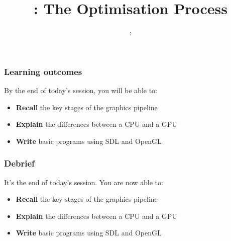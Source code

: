 \usepackage{../../beamerthemeFalmouthGamesAcademy}
\usepackage{multimedia}
\graphicspath{ {../../} }


\usepackage[normalem]{ulem}
\usepackage{wasysym}

\usepackage{pdfpages}

\usetikzlibrary{arrows,automata}




\title{\sessionnumber: The Optimisation Process}
\subtitle{\modulecode: \moduletitle}

\frame{\titlepage} 

\begin{frame}
	\frametitle{Learning outcomes}
	By the end of today's session, you will be able to:
	\begin{itemize}
		\item \textbf{Recall} the key stages of the graphics pipeline
		\item \textbf{Explain} the differences between a CPU and a GPU
		\item \textbf{Write} basic programs using SDL and OpenGL
	\end{itemize}
\end{frame}


\begin{frame}
	\frametitle{Debrief}
	It's the end of today's session. You are now able to:
	\begin{itemize}
		\item \textbf{Recall} the key stages of the graphics pipeline
		\item \textbf{Explain} the differences between a CPU and a GPU
		\item \textbf{Write} basic programs using SDL and OpenGL
	\end{itemize}
\end{frame}


